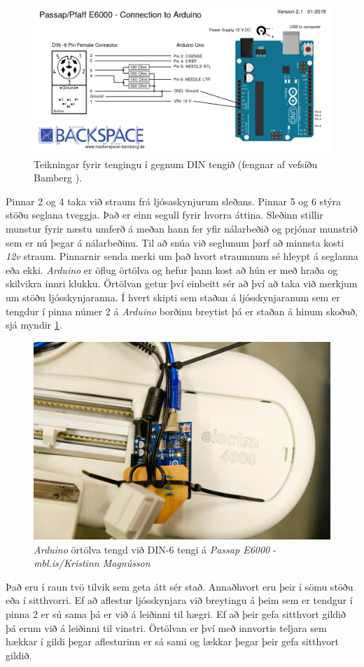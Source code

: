 \begin{figure}[H] %
    \centering
    \includegraphics[width=0.75\linewidth]{myndir/bambergDIN6.png}
    \caption{Teikningar fyrir tengingu í gegnum DIN tengið (fengnar af vefsíðu Bamberg \cite{bamberg}). }
    \label{fig:bambergDIN6}
\end{figure}
Pinnar 2 og 4 taka við straum frá ljósaskynjurum sleðans. Pinnar 5 og 6 stýra stöðu seglana tveggja. 
Það er einn segull fyrir hvorra áttina. Sleðinn stillir munstur fyrir næstu umferð á meðan hann fer yfir nálarbeðið og prjónar  munstrið sem er nú þegar á nálarbeðinu. Til að snúa við seglunum þarf að minnsta kosti \textit{12v} straum. Pinnarnir senda merki um það hvort straumnum sé hleypt á seglanna eða ekki. \textit{Arduino} er öflug örtölva og hefur þann kost að hún er með hraða og skilvikra innri klukku. Örtölvan getur því einbeitt sér að því að taka við merkjum um stöðu ljósskynjaranna. 
Í hvert skipti sem staðan á ljósskynjaranum sem er tengdur í pinna númer 2 á \textit{Arduino} borðinu breytist þá er staðan á hinum skoðuð, sjá myndir \ref{fig:bambergDIN6}.%

\begin{figure}[t]
    \centering
    \includegraphics[width=0.7\linewidth]{myndir/elli/electra4600.jpg}
    \caption{\textit{Arduino} örtölva tengd við DIN-6 tengi á \textit{Passap E6000} - \textit{mbl.is/Kristinn Magnússon}}
    \label{fig:arduino}
\end{figure}
Það eru í raun tvö tilvik sem geta átt sér stað. Annaðhvort eru þeir í sömu stöðu eða í sitthvorri. Ef að aflestur ljósskynjara við breytingu á þeim sem er tendgur í pinna 2 er sú sama þá er við á leiðinni til hægri. Ef að þeir gefa sitthvort gildið þá erum við á leiðinni til vinstri. Örtölvan er því með innvortis teljara sem hækkar í gildi þegar aflesturinn er sá sami og lækkar þegar þeir gefa sitthvort gildið.

